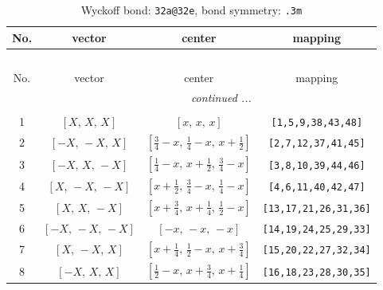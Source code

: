 \documentclass[fleqn,8pt]{jsarticle}
\begin{document}
\begin{longtable}{cccc}
\caption{Wyckoff bond: {\tt 32a@32e}, bond symmetry: {\tt .3m}}
 \\
 \hline \hline
No. & vector & center & mapping \\ \hline \endfirsthead

\multicolumn{3}{l}{\tablename\ \thetable{}} \\
 \hline \hline
No. & vector & center & mapping \\ \hline \endhead

 \hline \hline
\multicolumn{3}{r}{\footnotesize\it continued ...} \\ \endfoot

 \hline \hline
\multicolumn{3}{r}{} \\ \endlastfoot

1 & $\left[ X,\, X,\, X \right]$ & $\left[ x,\, x,\, x \right]$ & {\tt [1,5,9,38,43,48]} \\ \hline
2 & $\left[ - X,\, - X,\, X \right]$ & $\left[ \frac{3}{4} - x,\, \frac{1}{4} - x,\, x + \frac{1}{2} \right]$ & {\tt [2,7,12,37,41,45]} \\ \hline
3 & $\left[ - X,\, X,\, - X \right]$ & $\left[ \frac{1}{4} - x,\, x + \frac{1}{2},\, \frac{3}{4} - x \right]$ & {\tt [3,8,10,39,44,46]} \\ \hline
4 & $\left[ X,\, - X,\, - X \right]$ & $\left[ x + \frac{1}{2},\, \frac{3}{4} - x,\, \frac{1}{4} - x \right]$ & {\tt [4,6,11,40,42,47]} \\ \hline
5 & $\left[ X,\, X,\, - X \right]$ & $\left[ x + \frac{3}{4},\, x + \frac{1}{4},\, \frac{1}{2} - x \right]$ & {\tt [13,17,21,26,31,36]} \\ \hline
6 & $\left[ - X,\, - X,\, - X \right]$ & $\left[ - x,\, - x,\, - x \right]$ & {\tt [14,19,24,25,29,33]} \\ \hline
7 & $\left[ X,\, - X,\, X \right]$ & $\left[ x + \frac{1}{4},\, \frac{1}{2} - x,\, x + \frac{3}{4} \right]$ & {\tt [15,20,22,27,32,34]} \\ \hline
8 & $\left[ - X,\, X,\, X \right]$ & $\left[ \frac{1}{2} - x,\, x + \frac{3}{4},\, x + \frac{1}{4} \right]$ & {\tt [16,18,23,28,30,35]} \\
\end{longtable}
\renewcommand{\arraystretch}{1.2}
\end{document}
